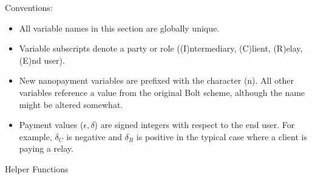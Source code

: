 \documentclass{article}
\begin{document}
Conventions:
\begin{itemize}
\item All variable names in this section are globally unique.
\item Variable subscripts denote a party or role ((I)ntermediary, (C)lient, (R)elay, (E)nd user).
\item New nanopayment variables are prefixed with the character (n). All other variables reference a value from the original Bolt scheme, although the name might be altered somewhat.
\item Payment values ($\epsilon, \delta$) are signed integers with respect to the end user. For example, $\delta_C$ is negative and $\delta_R$ is positive in the typical case where a client is paying a relay.
\end{itemize}

\begin{algorithm}
  \begin{algorithmic}[1]
    \caption{Helper Functions}
    \EndFunction{}
  \end{algorithmic}
\end{algorithm}
\end{document}

